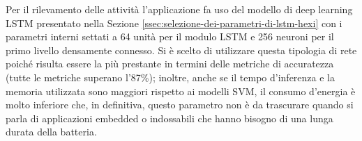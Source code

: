 Per il rilevamento delle attività l'applicazione fa uso del modello di deep learning LSTM presentato nella Sezione \ref{ssec:selezione-dei-parametri-di-lstm-hexi} con i parametri interni settati a 64 unità per il modulo LSTM e 256 neuroni per il primo livello densamente connesso. Si è scelto di utilizzare questa tipologia di rete poiché risulta essere la più prestante in termini delle metriche di accuratezza (tutte le metriche superano l'87\%); inoltre, anche se il tempo d'inferenza e la memoria utilizzata sono maggiori rispetto ai modelli SVM, il consumo d'energia è molto inferiore che, in definitiva, questo parametro non è da trascurare quando si parla di applicazioni embedded o indossabili che hanno bisogno di una lunga durata della batteria.